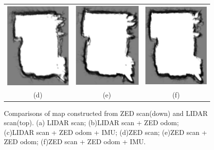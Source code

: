 \documentclass{article}
\begin{document}
\begin{figure}
\begin{tabular}{c c c}
         \includegraphics{images/figd.png} & \includegraphics{images/fige.png} & \includegraphics{images/figf.png} \\ (d) & (e) & (f)\\
    \end{tabular}
    \caption{Comparisons of map constructed from ZED scan(down) and LIDAR scan(top). (a) LIDAR scan; (b)LIDAR scan + ZED odom; (c)LIDAR scan + ZED odom + IMU; (d)ZED scan; (e)ZED scan + ZED odom; (f)ZED scan + ZED odom + IMU.}
    \label{fig:images}
\end{figure}
\end{document}
